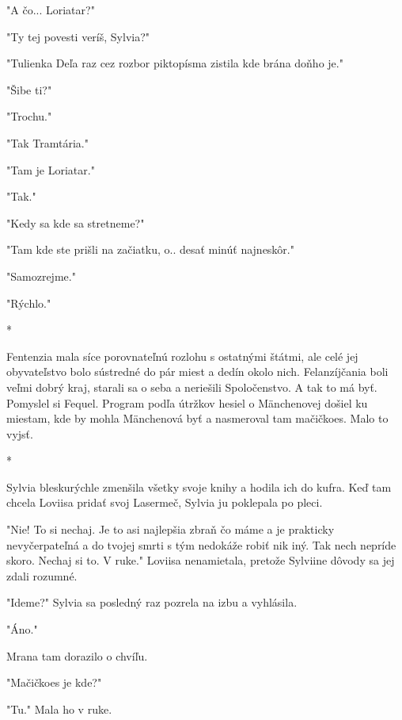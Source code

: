 \documentclass{book}
\begin{document}
"$ $A čo... Loriatar?"$ $ 

"$ $Ty tej povesti veríš, Sylvia?"$ $ 

"$ $Tulienka Deľa raz cez rozbor piktopísma zistila kde brána doňho je."$ $ 

"$ $Šibe ti?"$ $ 

"$ $Trochu."$ $ 

"$ $Tak Tramtária."$ $ 

"$ $Tam je Loriatar."$ $ 

"$ $Tak."$ $ 

"$ $Kedy sa kde sa stretneme?"$ $ 

"$ $Tam kde ste prišli na začiatku, o.. desať minúť najneskôr."$ $ 

"$ $Samozrejme."$ $ 

"$ $Rýchlo."$ $ 

\begin{center}

*

\end{center}

Fentenzia mala síce porovnateľnú rozlohu s ostatnými štátmi, ale celé jej obyvateľstvo bolo sústredné do pár miest a dedín okolo nich. Felanzíjčania boli veľmi dobrý kraj, starali sa o seba a neriešili Spoločenstvo. A tak to má byť. Pomyslel si Fequel. Program podľa útržkov hesiel o Mänchenovej došiel ku miestam, kde by mohla Mänchenová byť a nasmeroval tam mačičkoes. Malo to vyjsť.

\begin{center}

*

\end{center}

Sylvia bleskurýchle zmenšila všetky svoje knihy a hodila ich do kufra. Keď tam chcela Loviisa pridať svoj Lasermeč, Sylvia ju poklepala po pleci.

"$ $Nie! To si nechaj. Je to asi najlepšia zbraň čo máme a je prakticky nevyčerpateľná a do tvojej smrti s tým nedokáže robiť nik iný. Tak nech nepríde skoro. Nechaj si to. V ruke."$ $  Loviisa nenamietala, pretože Sylviine dôvody sa jej zdali rozumné.

"$ $Ideme?"$ $  Sylvia sa posledný raz pozrela na izbu a vyhlásila.

"$ $Áno."$ $ 

Mrana tam dorazilo o chvíľu.

"$ $Mačičkoes je kde?"$ $ 

"$ $Tu."$ $  Mala ho v ruke.
\end{document}
